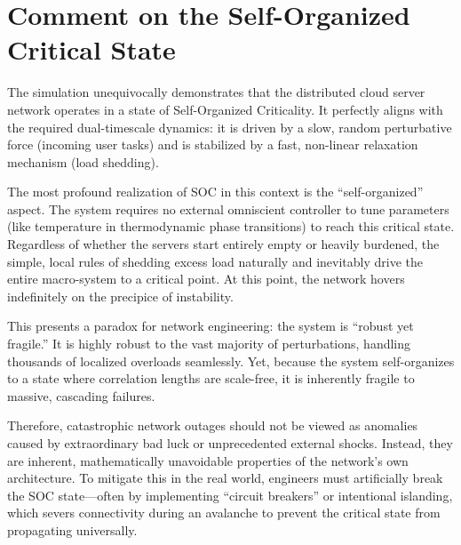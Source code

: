 \documentclass[12pt,a4paper]{article}
\begin{document}
\section{Comment on the Self-Organized Critical State}
The simulation unequivocally demonstrates that the distributed cloud server network operates in a state of Self-Organized Criticality. It perfectly aligns with the required dual-timescale dynamics: it is driven by a slow, random perturbative force (incoming user tasks) and is stabilized by a fast, non-linear relaxation mechanism (load shedding). 

The most profound realization of SOC in this context is the ``self-organized'' aspect. The system requires no external omniscient controller to tune parameters (like temperature in thermodynamic phase transitions) to reach this critical state. Regardless of whether the servers start entirely empty or heavily burdened, the simple, local rules of shedding excess load naturally and inevitably drive the entire macro-system to a critical point. At this point, the network hovers indefinitely on the precipice of instability.

This presents a paradox for network engineering: the system is ``robust yet fragile.'' It is highly robust to the vast majority of perturbations, handling thousands of localized overloads seamlessly. Yet, because the system self-organizes to a state where correlation lengths are scale-free, it is inherently fragile to massive, cascading failures. 

Therefore, catastrophic network outages should not be viewed as anomalies caused by extraordinary bad luck or unprecedented external shocks. Instead, they are inherent, mathematically unavoidable properties of the network's own architecture. To mitigate this in the real world, engineers must artificially break the SOC state—often by implementing ``circuit breakers'' or intentional islanding, which severs connectivity during an avalanche to prevent the critical state from propagating universally.

\vspace{0.5cm}
\end{document}
